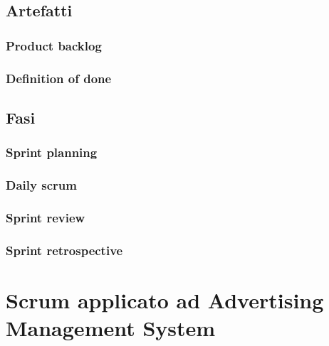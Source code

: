 \subsection{Artefatti}

\subsubsection{Product backlog}

\subsubsection{Definition of done}

\subsection{Fasi}

\subsubsection{Sprint planning}

\subsubsection{Daily scrum}

\subsubsection{Sprint review}

\subsubsection{Sprint retrospective}

\section{Scrum applicato ad Advertising Management System}